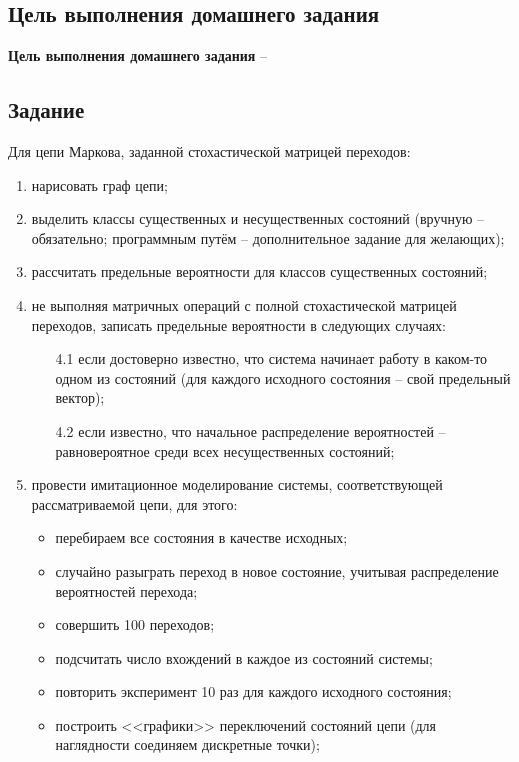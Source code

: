\subsection{Цель выполнения домашнего задания}\label{blockN.VariantM}
\textbf{Цель выполнения домашнего задания }-- \GoalOfResearch

\subsection{Задание}
Для цепи Маркова, заданной стохастической матрицей переходов:
\begin{enumerate}
    \item нарисовать граф цепи;
    \item выделить классы существенных и несущественных состояний (вручную – обязательно; программным путём – дополнительное задание для желающих);
    \item рассчитать предельные вероятности для классов существенных состояний;
    \item не выполняя матричных операций с полной стохастической матрицей переходов, записать предельные вероятности в следующих случаях:
    \begin{enumerate}
        \item[4.1] если достоверно известно, что система начинает работу в каком-то одном из состояний (для каждого исходного состояния – свой предельный вектор);
        \item[4.2] если известно, что начальное распределение вероятностей – равновероятное среди всех несущественных состояний;
    \end{enumerate}
    \item провести имитационное моделирование системы, соответствующей рассматриваемой цепи, для этого:
    \begin{itemize}
        \item перебираем все состояния в качестве исходных;
        \item случайно разыграть переход в новое состояние, учитывая распределение вероятностей перехода;
        \item совершить 100 переходов;
        \item подсчитать число вхождений в каждое из состояний системы;
        \item повторить эксперимент 10 раз для каждого исходного состояния;
        \item  построить <<графики>> переключений состояний цепи (для наглядности соединяем дискретные точки);
    \end{itemize}
\end{enumerate}
\newpage
